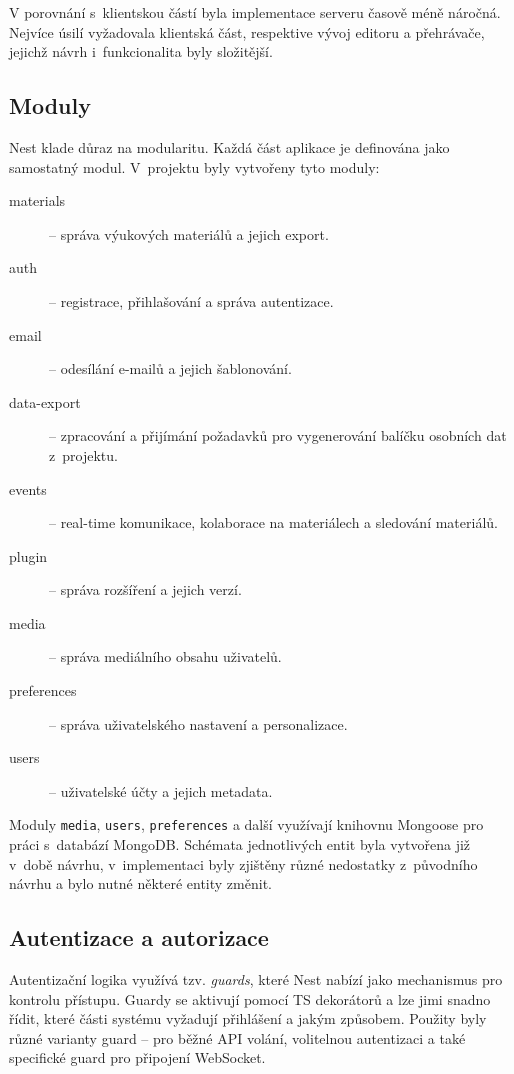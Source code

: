 V porovnání s~klientskou částí byla implementace serveru časově méně náročná.
Nejvíce úsilí vyžadovala klientská část, respektive vývoj editoru a přehrávače, jejichž návrh i~funkcionalita byly složitější.

\subsection{Moduly}

Nest klade důraz na modularitu. Každá část aplikace je definována jako samostatný modul. V~projektu byly vytvořeny tyto moduly:

\begin{description}
    \item[materials] -- správa výukových materiálů a jejich export.
    \item[auth] -- registrace, přihlašování a správa autentizace.
    \item[email] -- odesílání e-mailů a jejich šablonování.
    \item[data-export] -- zpracování a přijímání požadavků pro vygenerování balíčku osobních dat z~projektu.
    \item[events] -- real-time komunikace, kolaborace na materiálech a sledování materiálů.
    \item[plugin] -- správa rozšíření a jejich verzí.
    \item[media] -- správa mediálního obsahu uživatelů. 
    \item[preferences] -- správa uživatelského nastavení a personalizace.
    \item[users] -- uživatelské účty a jejich metadata.
\end{description}

Moduly \texttt{media}, \texttt{users}, \texttt{preferences} a další využívají knihovnu Mongoose pro práci s~databází MongoDB. 
Schémata jednotlivých entit byla vytvořena již v~době návrhu, v~implementaci byly zjištěny různé nedostatky z~původního návrhu a bylo nutné některé entity změnit.

\subsection{Autentizace a autorizace}

Autentizační logika využívá tzv. \emph{guards}, které Nest nabízí jako mechanismus pro kontrolu přístupu.
Guardy se aktivují pomocí TS dekorátorů a lze jimi snadno řídit, které části systému vyžadují přihlášení a jakým způsobem. 
Použity byly různé varianty guard -- pro běžné API volání, volitelnou autentizaci a také specifické guard pro připojení WebSocket.

